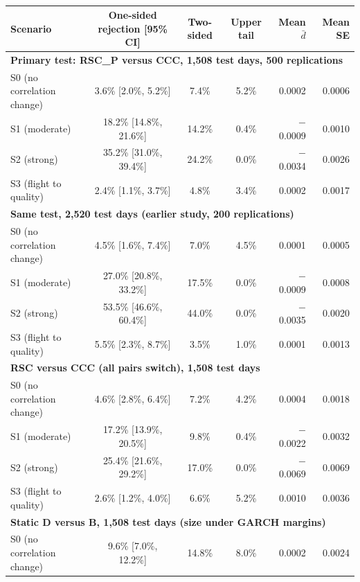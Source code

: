 \begin{table}[t]
\centering{}\footnotesize\setlength{\tabcolsep}{5pt}
\caption{}\label{tab:power1508}
\begin{tabular}{lcccrr}
\toprule
Scenario & One-sided rejection [95\% CI] & Two-sided & Upper tail & Mean $\bar d$ & Mean SE \\
\midrule
\multicolumn{6}{l}{\textbf{Primary test: RSC\_P versus CCC, 1,508 test days, 500 replications}}\\
S0 (no correlation change) & 3.6\% [2.0\%, 5.2\%] & 7.4\% & 5.2\% & 0.0002 & 0.0006 \\
S1 (moderate) & 18.2\% [14.8\%, 21.6\%] & 14.2\% & 0.4\% & $-$0.0009 & 0.0010 \\
S2 (strong) & 35.2\% [31.0\%, 39.4\%] & 24.2\% & 0.0\% & $-$0.0034 & 0.0026 \\
S3 (flight to quality) & 2.4\% [1.1\%, 3.7\%] & 4.8\% & 3.4\% & 0.0002 & 0.0017 \\
\midrule
\multicolumn{6}{l}{\textbf{Same test, 2,520 test days (earlier study, 200 replications)}}\\
S0 (no correlation change) & 4.5\% [1.6\%, 7.4\%] & 7.0\% & 4.5\% & 0.0001 & 0.0005 \\
S1 (moderate) & 27.0\% [20.8\%, 33.2\%] & 17.5\% & 0.0\% & $-$0.0009 & 0.0008 \\
S2 (strong) & 53.5\% [46.6\%, 60.4\%] & 44.0\% & 0.0\% & $-$0.0035 & 0.0020 \\
S3 (flight to quality) & 5.5\% [2.3\%, 8.7\%] & 3.5\% & 1.0\% & 0.0001 & 0.0013 \\
\midrule
\multicolumn{6}{l}{\textbf{RSC versus CCC (all pairs switch), 1,508 test days}}\\
S0 (no correlation change) & 4.6\% [2.8\%, 6.4\%] & 7.2\% & 4.2\% & 0.0004 & 0.0018 \\
S1 (moderate) & 17.2\% [13.9\%, 20.5\%] & 9.8\% & 0.4\% & $-$0.0022 & 0.0032 \\
S2 (strong) & 25.4\% [21.6\%, 29.2\%] & 17.0\% & 0.0\% & $-$0.0069 & 0.0069 \\
S3 (flight to quality) & 2.6\% [1.2\%, 4.0\%] & 6.6\% & 5.2\% & 0.0010 & 0.0036 \\
\midrule
\multicolumn{6}{l}{\textbf{Static D versus B, 1,508 test days (size under GARCH margins)}}\\
S0 (no correlation change) & 9.6\% [7.0\%, 12.2\%] & 14.8\% & 8.0\% & 0.0002 & 0.0024 \\
\bottomrule
\end{tabular}
\end{table}
